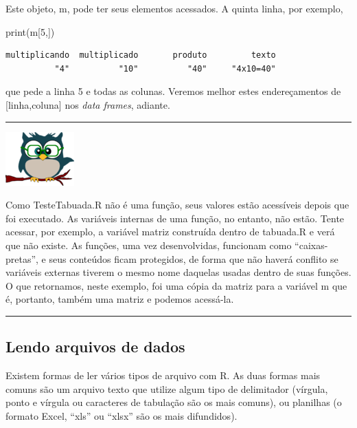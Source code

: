 \documentclass[
]{article}
\newenvironment{Shaded}{\begin{snugshade}}{\end{snugshade}}
\newcommand{\DecValTok}[1]{\textcolor[rgb]{0.00,0.00,0.81}{#1}}
\newcommand{\FunctionTok}[1]{\textcolor[rgb]{0.00,0.00,0.00}{#1}}
\newcommand{\NormalTok}[1]{#1}
\begin{document}
Este objeto, m, pode ter seus elementos acessados. A quinta linha, por
exemplo,

\begin{Shaded}
\begin{Highlighting}[]
\FunctionTok{print}\NormalTok{(m[}\DecValTok{5}\NormalTok{,])}
\end{Highlighting}
\end{Shaded}

\begin{verbatim}
multiplicando  multiplicado       produto         texto 
          "4"          "10"          "40"     "4x10=40" 
\end{verbatim}

que pede a linha 5 e todas as colunas. Veremos melhor estes
endereçamentos de {[}linha,coluna{]} nos \emph{data frames}, adiante.

\begin{center}\rule{0.5\linewidth}{0.5pt}\end{center}

\begin{flushleft}\includegraphics[width=0.08\linewidth]{coruja} \end{flushleft}

Como TesteTabuada.R não é uma função, seus valores estão acessíveis
depois que foi executado. As variáveis internas de uma função, no
entanto, não estão. Tente acessar, por exemplo, a variável matriz
construída dentro de tabuada.R e verá que não existe. As funções, uma
vez desenvolvidas, funcionam como ``caixas-pretas'', e seus conteúdos
ficam protegidos, de forma que não haverá conflito se variáveis externas
tiverem o mesmo nome daquelas usadas dentro de suas funções. O que
retornamos, neste exemplo, foi uma cópia da matriz para a variável m que
é, portanto, também uma matriz e podemos acessá-la.

\begin{center}\rule{0.5\linewidth}{0.5pt}\end{center}

\hypertarget{lendo-arquivos-de-dados}{%
\subsection{Lendo arquivos de dados}\label{lendo-arquivos-de-dados}}

Existem formas de ler vários tipos de arquivo com R. As duas formas mais
comuns são um arquivo texto que utilize algum tipo de delimitador
(vírgula, ponto e vírgula ou caracteres de tabulação são os mais
comuns), ou planilhas (o formato Excel, ``xls'' ou ``xlsx'' são os mais
difundidos).
\end{document}
